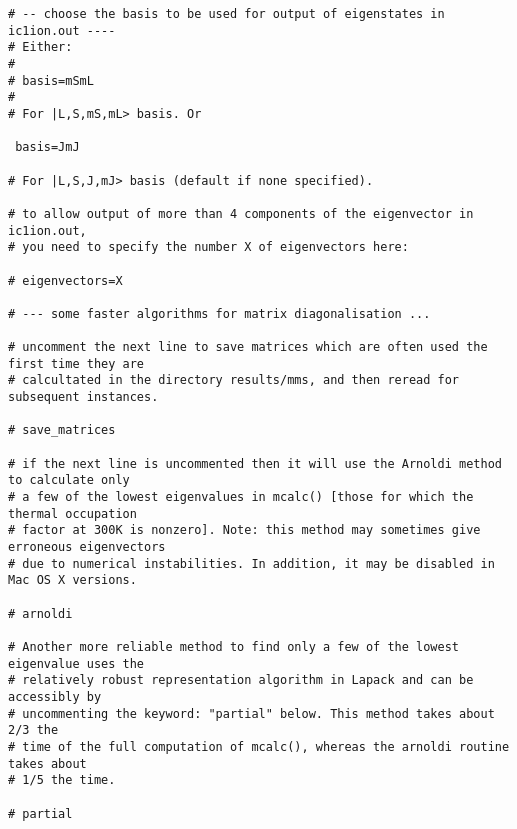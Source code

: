 {\begin{verbatim}
# -- choose the basis to be used for output of eigenstates in ic1ion.out ----
# Either:
#
# basis=mSmL
#
# For |L,S,mS,mL> basis. Or
 
 basis=JmJ

# For |L,S,J,mJ> basis (default if none specified).

# to allow output of more than 4 components of the eigenvector in ic1ion.out, 
# you need to specify the number X of eigenvectors here:

# eigenvectors=X

# --- some faster algorithms for matrix diagonalisation ...

# uncomment the next line to save matrices which are often used the first time they are
# calcultated in the directory results/mms, and then reread for subsequent instances.

# save_matrices

# if the next line is uncommented then it will use the Arnoldi method to calculate only 
# a few of the lowest eigenvalues in mcalc() [those for which the thermal occupation
# factor at 300K is nonzero]. Note: this method may sometimes give erroneous eigenvectors
# due to numerical instabilities. In addition, it may be disabled in Mac OS X versions.

# arnoldi

# Another more reliable method to find only a few of the lowest eigenvalue uses the 
# relatively robust representation algorithm in Lapack and can be accessibly by 
# uncommenting the keyword: "partial" below. This method takes about 2/3 the
# time of the full computation of mcalc(), whereas the arnoldi routine takes about
# 1/5 the time.

# partial


\end{verbatim}}
